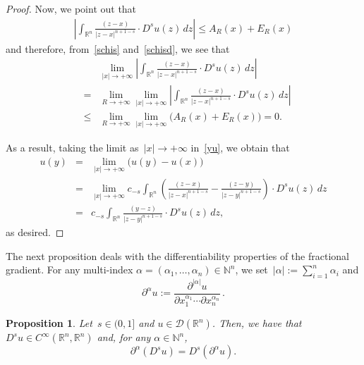 \documentclass[11pt,hyp,]{nyjm}
\numberwithin{equation}{section}
\newcommand{\R}{\mathbb{R}}
\newcommand{\N}{\mathbb{N}}
\newtheorem{proposition}[theorem]{Proposition}
\theoremstyle{remark}
\newcommand{\Int}{\int_{\mathbb{R}^n}}
\renewcommand{\le}{\leqslant}
\begin{document}
\begin{proof}
Now, we point out that
\begin{eqnarray*}
\left| \Int \frac{(z-x)}{|z-x|^{n+1-s}} \cdot D^{s}u(z) \, dz  \right| \le A_R(x)+E_R(x)
\end{eqnarray*}
and therefore,
from~\eqref{schis} and~\eqref{schisd}, we see that
\begin{eqnarray*}&&
\lim_{|x|\to+\infty}\left| \Int \frac{(z-x)}{|z-x|^{n+1-s}} \cdot D^{s}u(z) \, dz  \right| \\&
=& \lim_{R\to+\infty}\lim_{|x|\to+\infty}\left| \Int \frac{(z-x)}{|z-x|^{n+1-s}} \cdot D^{s}u(z) \, dz  \right| \\
&
\le& \lim_{R\to+\infty}\lim_{|x|\to+\infty}\Big(A_R(x)+E_R(x)\Big)=0.
\end{eqnarray*}

As a result, taking the limit as~$|x|\to+\infty$ in~\eqref{yu}, we obtain that 
\begin{eqnarray*}
u(y)&=&\lim_{|x|\to+\infty}\Big(u(y)-u(x)\Big)
\\&=& \lim_{|x|\to+\infty} c_{-s} \Int \left( \frac{(z-x)}{|z-x|^{n+1-s}} - \frac{(z-y)}{|z-y|^{n+1-s}} \right) \cdot D^{s}u(z) \, dz\\
&=& c_{-s} \Int \frac{(y-z)}{|z-y|^{n+1-s}} \cdot D^{s}u(z) \, dz,
\end{eqnarray*}
as desired.
\end{proof}
The next proposition deals with the differentiability properties of the fractional gradient. For any multi-index $\alpha= (\alpha_1, \ldots, \alpha_n)\in\N^n$, we set~$|\alpha|:= \sum_{i=1}^n \alpha_i$ and
\[ \partial^{\alpha} u := \frac{\partial^{|\alpha|}u}{\partial x_1^{\alpha_1} \cdots \partial x_{n}^{\alpha_n}} \, .\]
\begin{proposition}\label{ffffff}
Let~$s\in(0,1]$ and $u \in \mathcal{D}(\R^n)$. Then, we have that~$D^s u \in C^{\infty}(\R^n, \R^n)$ and, for any $\alpha\in\N^n$,
\begin{equation}\label{emscdl}
\partial^{\alpha} \left(D^s u \right) = D^s \left(\partial^{\alpha} u \right).
\end{equation}
\end{proposition}
\end{document}
